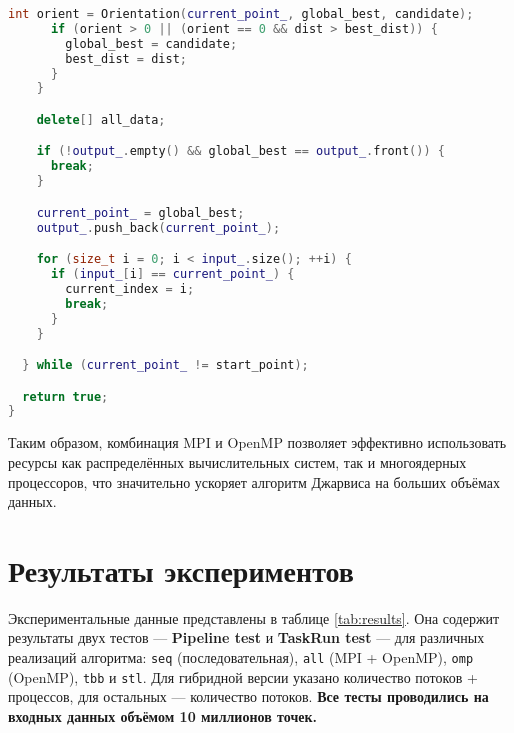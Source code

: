\documentclass[a4paper,12pt]{article}
\begin{document}
\begin{itemize}
\begin{lstlisting}[language=C++, caption={Основной цикл алгоритма с MPI и OpenMP}]
      int orient = Orientation(current_point_, global_best, candidate);
      if (orient > 0 || (orient == 0 && dist > best_dist)) {
        global_best = candidate;
        best_dist = dist;
      }
    }

    delete[] all_data;

    if (!output_.empty() && global_best == output_.front()) {
      break;
    }

    current_point_ = global_best;
    output_.push_back(current_point_);

    for (size_t i = 0; i < input_.size(); ++i) {
      if (input_[i] == current_point_) {
        current_index = i;
        break;
      }
    }

  } while (current_point_ != start_point);

  return true;
}
\end{lstlisting}

Таким образом, комбинация MPI и OpenMP позволяет эффективно использовать ресурсы как распределённых вычислительных систем, так и многоядерных процессоров, что значительно ускоряет алгоритм Джарвиса на больших объёмах данных.
\newpage
\section{Результаты экспериментов}

Экспериментальные данные представлены в таблице \ref{tab:results}. Она содержит результаты двух тестов --- \textbf{Pipeline test} и \textbf{TaskRun test} --- для различных реализаций алгоритма: \texttt{seq} (последовательная), \texttt{all} (MPI + OpenMP), \texttt{omp} (OpenMP), \texttt{tbb} и \texttt{stl}. Для гибридной версии указано количество потоков + процессов, для остальных --- количество потоков. \textbf{Все тесты проводились на входных данных объёмом 10 миллионов точек.}


\end{itemize}
\end{document}
